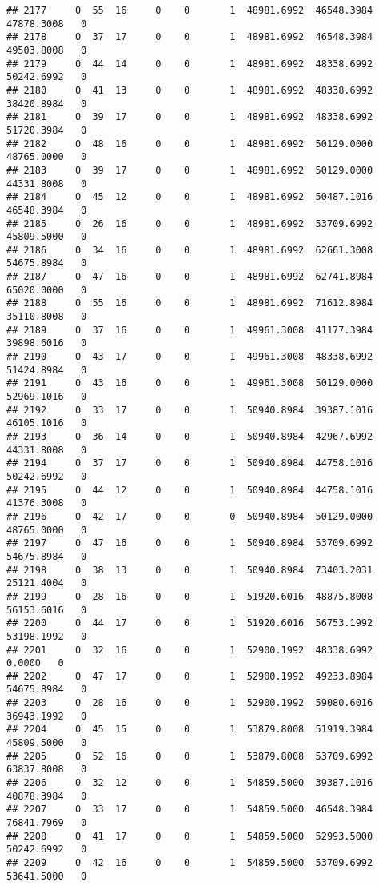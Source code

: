 \documentclass[
]{article}
\begin{document}
\begin{enumerate}
\begin{verbatim}
## 2177     0  55  16     0    0       1  48981.6992  46548.3984  47878.3008   0
## 2178     0  37  17     0    0       1  48981.6992  46548.3984  49503.8008   0
## 2179     0  44  14     0    0       1  48981.6992  48338.6992  50242.6992   0
## 2180     0  41  13     0    0       1  48981.6992  48338.6992  38420.8984   0
## 2181     0  39  17     0    0       1  48981.6992  48338.6992  51720.3984   0
## 2182     0  48  16     0    0       1  48981.6992  50129.0000  48765.0000   0
## 2183     0  39  17     0    0       1  48981.6992  50129.0000  44331.8008   0
## 2184     0  45  12     0    0       1  48981.6992  50487.1016  46548.3984   0
## 2185     0  26  16     0    0       1  48981.6992  53709.6992  45809.5000   0
## 2186     0  34  16     0    0       1  48981.6992  62661.3008  54675.8984   0
## 2187     0  47  16     0    0       1  48981.6992  62741.8984  65020.0000   0
## 2188     0  55  16     0    0       1  48981.6992  71612.8984  35110.8008   0
## 2189     0  37  16     0    0       1  49961.3008  41177.3984  39898.6016   0
## 2190     0  43  17     0    0       1  49961.3008  48338.6992  51424.8984   0
## 2191     0  43  16     0    0       1  49961.3008  50129.0000  52969.1016   0
## 2192     0  33  17     0    0       1  50940.8984  39387.1016  46105.1016   0
## 2193     0  36  14     0    0       1  50940.8984  42967.6992  44331.8008   0
## 2194     0  37  17     0    0       1  50940.8984  44758.1016  50242.6992   0
## 2195     0  44  12     0    0       1  50940.8984  44758.1016  41376.3008   0
## 2196     0  42  17     0    0       0  50940.8984  50129.0000  48765.0000   0
## 2197     0  47  16     0    0       1  50940.8984  53709.6992  54675.8984   0
## 2198     0  38  13     0    0       1  50940.8984  73403.2031  25121.4004   0
## 2199     0  28  16     0    0       1  51920.6016  48875.8008  56153.6016   0
## 2200     0  44  17     0    0       1  51920.6016  56753.1992  53198.1992   0
## 2201     0  32  16     0    0       1  52900.1992  48338.6992      0.0000   0
## 2202     0  47  17     0    0       1  52900.1992  49233.8984  54675.8984   0
## 2203     0  28  16     0    0       1  52900.1992  59080.6016  36943.1992   0
## 2204     0  45  15     0    0       1  53879.8008  51919.3984  45809.5000   0
## 2205     0  52  16     0    0       1  53879.8008  53709.6992  63837.8008   0
## 2206     0  32  12     0    0       1  54859.5000  39387.1016  40878.3984   0
## 2207     0  33  17     0    0       1  54859.5000  46548.3984  76841.7969   0
## 2208     0  41  17     0    0       1  54859.5000  52993.5000  50242.6992   0
## 2209     0  42  16     0    0       1  54859.5000  53709.6992  53641.5000   0

\end{verbatim}
\end{enumerate}
\end{document}
